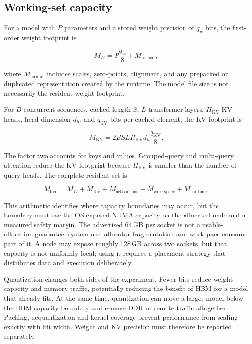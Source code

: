\FloatBarrier

\subsection{Working-set capacity}
\label{sec:working-set}

For a model with \(P\) parameters and a stored weight precision of
\(q_w\) bits, the first-order weight footprint is

\[
  M_W = P\frac{q_w}{8} + M_{\mathrm{format}},
\]

where \(M_{\mathrm{format}}\) includes scales, zero-points, alignment,
and any prepacked or duplicated representation created by the runtime.
The model file size is not necessarily the resident weight footprint.

For \(B\) concurrent sequences, cached length \(S\), \(L\) transformer
layers, \(H_{\mathrm{KV}}\) KV heads, head dimension \(d_h\), and
\(q_{\mathrm{KV}}\) bits per cached element, the KV footprint is

\[
  M_{\mathrm{KV}} =
  2 B S L H_{\mathrm{KV}} d_h \frac{q_{\mathrm{KV}}}{8}.
\]

The factor two accounts for keys and values.  Grouped-query and
multi-query attention reduce the KV footprint because
\(H_{\mathrm{KV}}\) is smaller than the number of query heads.  The
complete resident set is

\[
  M_{\mathrm{live}} =
  M_W + M_{\mathrm{KV}} + M_{\mathrm{activations}}
  + M_{\mathrm{workspace}} + M_{\mathrm{runtime}}.
\]

This arithmetic identifies where capacity boundaries may occur, but the
boundary must use the OS-exposed NUMA capacity on the allocated node and
a measured safety margin.  The advertised 64\,GB per socket is not a
usable-allocation guarantee: system use, allocator fragmentation and
workspace consume part of it.  A node may expose roughly 128\,GB across
two sockets, but that capacity is not uniformly local; using it requires
a placement strategy that distributes data and execution deliberately.

Quantization changes both sides of the experiment.  Fewer bits reduce
weight capacity and memory traffic, potentially reducing the benefit of
HBM for a model that already fits.  At the same time, quantization can
move a larger model below the HBM capacity boundary and remove DDR or
remote traffic altogether.  Packing, dequantization and kernel coverage
prevent performance from scaling exactly with bit width.  Weight and KV
precision must therefore be reported separately.

